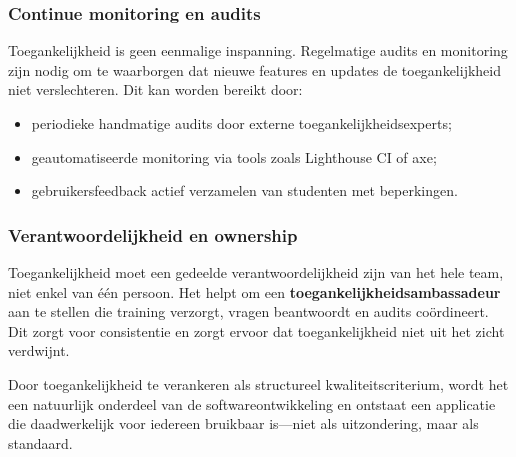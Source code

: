 \subsubsection{Continue monitoring en audits}

Toegankelijkheid is geen eenmalige inspanning. Regelmatige audits en monitoring zijn nodig om te waarborgen dat nieuwe features en updates de toegankelijkheid niet verslechteren. Dit kan worden bereikt door:

\begin{itemize}
    \item periodieke handmatige audits door externe toegankelijkheidsexperts;
    \item geautomatiseerde monitoring via tools zoals Lighthouse CI of axe;
    \item gebruikersfeedback actief verzamelen van studenten met beperkingen.
\end{itemize}

\subsubsection{Verantwoordelijkheid en ownership}

Toegankelijkheid moet een gedeelde verantwoordelijkheid zijn van het hele team, niet enkel van één persoon. Het helpt om een \textbf{toegankelijkheidsambassadeur} aan te stellen die training verzorgt, vragen beantwoordt en audits coördineert. Dit zorgt voor consistentie en zorgt ervoor dat toegankelijkheid niet uit het zicht verdwijnt.

Door toegankelijkheid te verankeren als structureel kwaliteitscriterium, wordt het een natuurlijk onderdeel van de softwareontwikkeling en ontstaat een applicatie die daadwerkelijk voor iedereen bruikbaar is—niet als uitzondering, maar als standaard.


